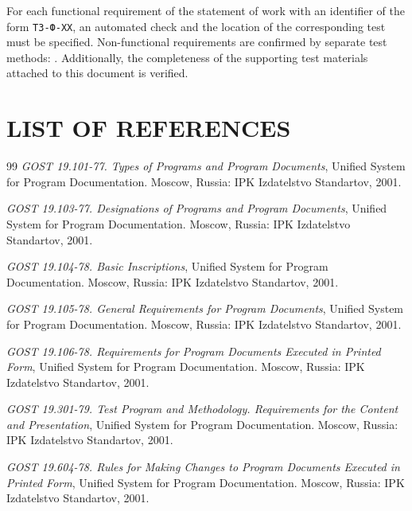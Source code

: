 \documentclass[12pt,a4paper]{extarticle}
\begin{document}
\begin{hseExample}
For each functional requirement of the statement of work with an identifier of the form \texttt{ТЗ-Ф-XX}, an automated check and the location of the corresponding test must be specified. Non-functional requirements are confirmed by separate test methods: . Additionally, the completeness of the supporting test materials attached to this document is verified.
\end{hseExample}

\clearpage
\pagestyle{appendix}

\section*{LIST OF REFERENCES}

\renewcommand{\refname}{}
\begin{thebibliography}{99}
\emph{GOST 19.101-77. Types of Programs and Program Documents}, Unified System for Program Documentation. Moscow, Russia: IPK Izdatelstvo Standartov, 2001.

\emph{GOST 19.103-77. Designations of Programs and Program Documents}, Unified System for Program Documentation. Moscow, Russia: IPK Izdatelstvo Standartov, 2001.

\emph{GOST 19.104-78. Basic Inscriptions}, Unified System for Program Documentation. Moscow, Russia: IPK Izdatelstvo Standartov, 2001.

\emph{GOST 19.105-78. General Requirements for Program Documents}, Unified System for Program Documentation. Moscow, Russia: IPK Izdatelstvo Standartov, 2001.

\emph{GOST 19.106-78. Requirements for Program Documents Executed in Printed Form}, Unified System for Program Documentation. Moscow, Russia: IPK Izdatelstvo Standartov, 2001.

\emph{GOST 19.301-79. Test Program and Methodology. Requirements for the Content and Presentation}, Unified System for Program Documentation. Moscow, Russia: IPK Izdatelstvo Standartov, 2001.

\emph{GOST 19.604-78. Rules for Making Changes to Program Documents Executed in Printed Form}, Unified System for Program Documentation. Moscow, Russia: IPK Izdatelstvo Standartov, 2001.
\end{thebibliography}



\clearpage


\end{document}
